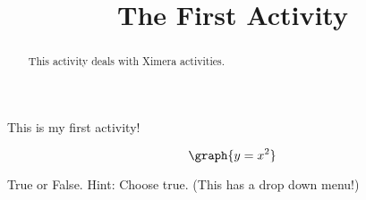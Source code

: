 \documentclass{ximera}
\title{The First Activity}
\begin{document}
      
\begin{abstract}
      
This activity deals with Ximera activities.
      
\end{abstract}
      
\maketitle

This is my first activity!



\[
\graph{y=x^2}
\]

\begin{problem}
\begin{selectAll}
\end{selectAll}
\end{problem}


\begin{question}
True or False. Hint: Choose true. (This has a drop down menu!) 
\end{question}
\end{document}
